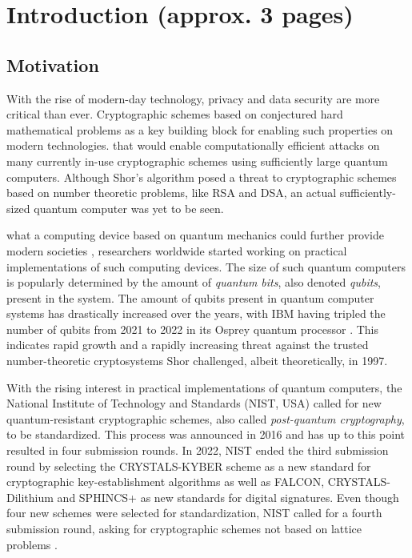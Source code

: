 \section{Introduction (approx. 3 pages)} \label{sec:intro}
\subsection{Motivation}
With the rise of modern-day technology, privacy and data security are more critical than ever. Cryptographic schemes based on conjectured hard mathematical problems  as a key building block for enabling such properties on modern technologies.  that would enable computationally efficient attacks on many currently in-use cryptographic schemes using sufficiently large quantum computers. Although Shor's algorithm posed a threat to cryptographic schemes based on number theoretic problems, like RSA and DSA, an actual sufficiently-sized quantum computer was yet to be seen. 

 what a computing device based on quantum mechanics could further provide modern societies , researchers worldwide started working on practical implementations of such computing devices. The size of such quantum computers is popularly determined by the amount of \textit{quantum bits}, also denoted \textit{qubits}, present in the system. The amount of qubits present in quantum computer systems has drastically increased over the years, with IBM having tripled the number of qubits from 2021 to 2022 in its Osprey quantum processor \cite{IBM_Osprey}. This indicates rapid growth and a rapidly increasing threat against the trusted number-theoretic cryptosystems Shor challenged, albeit theoretically, in 1997.

With the rising interest in practical implementations of quantum computers, the National Institute of Technology and Standards (NIST, USA) called for new quantum-resistant cryptographic schemes, also called \textit{post-quantum cryptography}, to be standardized. This process was announced in 2016 and has up to this point resulted in four submission rounds. In 2022, NIST ended the third submission round by selecting the CRYSTALS-KYBER scheme as a new standard for cryptographic key-establishment algorithms as well as FALCON, CRYSTALS-Dilithium and SPHINCS+ as new standards for digital signatures. Even though four new schemes were selected for standardization, NIST called for a fourth submission round, asking for cryptographic schemes not based on lattice problems \cite{nist_third_rd_update}. 


